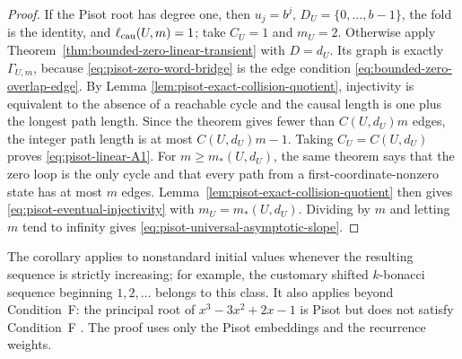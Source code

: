 \begin{proof}
If the Pisot root has degree one, then $u_j=b^j$,
$D_U=\{0,\ldots,b-1\}$, the fold is the identity, and
$\ell_{\rm cau}(U,m)=1$; take $C_U=1$ and $m_U=2$.  Otherwise apply
Theorem~\ref{thm:bounded-zero-linear-transient} with $D=d_U$.  Its graph is
exactly $\Gamma_{U,m}$, because \eqref{eq:pisot-zero-word-bridge} is the
edge condition \eqref{eq:bounded-zero-overlap-edge}.  By Lemma
\ref{lem:pisot-exact-collision-quotient}, injectivity is equivalent to the
absence of a reachable cycle and the causal length is one plus the longest
path length.  Since the theorem gives fewer than $C(U,d_U)m$ edges, the
integer path length is at most $C(U,d_U)m-1$.  Taking
$C_U=C(U,d_U)$ proves \eqref{eq:pisot-linear-A1}.  For
$m\ge m_*(U,d_U)$, the same theorem says that the zero loop is the only
cycle and that every path from a first-coordinate-nonzero state has at most
$m$ edges.  Lemma~\ref{lem:pisot-exact-collision-quotient} then gives
\eqref{eq:pisot-eventual-injectivity} with
$m_U=m_*(U,d_U)$.  Dividing by $m$ and letting $m$ tend to infinity gives
\eqref{eq:pisot-universal-asymptotic-slope}.
\end{proof}

The corollary applies to nonstandard initial values whenever the resulting
sequence is strictly increasing; for example, the customary shifted
$k$-bonacci sequence beginning $1,2,\ldots$ belongs to this class.  It also
applies beyond Condition~F: the principal root of $x^3-3x^2+2x-1$ is Pisot
but does not satisfy Condition~F \cite[Theorem~3]{Akiyama2000}.  The proof
uses only the Pisot embeddings and the recurrence weights.
